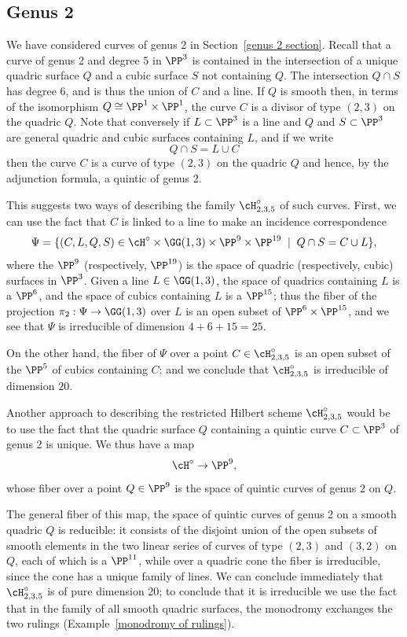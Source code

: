 \subsection{Genus 2}

We have considered curves of genus 2 in Section~\ref{genus 2 section}.  Recall that a curve of genus 2 and degree 5 in 
$\PP^3$ is contained in the intersection of a unique quadric surface $Q$ and a cubic surface $S$ not containing $Q$.
The intersection $Q\cap S$
has degree 6, and is thus the union of $C$ and a line. If $Q$ is smooth then, in terms of the isomorphism $Q \cong \PP^1 \times \PP^1$, the curve $C$ is a divisor of type $(2,3)$ on the quadric $Q$. Note that conversely if $L \subset \PP^3$ is a line and $Q$ and $S \subset \PP^3$ are general quadric and cubic surfaces containing $L$, and if we write
$$
Q \cap S = L \cup C
$$ 
then the curve $C$ is a curve of type $(2,3)$ on the quadric $Q$ and hence, by the adjunction formula,
 a quintic of genus 2.

This suggests two ways of describing the family $\cH^\circ_{2,3,5}$ of such curves. First, we can use the fact that $C$ is linked to a line to make an incidence correspondence
$$
\Psi = \{ (C, L, Q, S) \in \cH^\circ \times \GG(1,3) \times \PP^9 \times \PP^{19} \; \mid \; Q \cap S = C \cup L \},
$$
where the $\PP^9$ (respectively, $\PP^{19}$) is the space of quadric (respectively, cubic) surfaces in $\PP^3$. Given a line $L \in \GG(1,3)$, the space of quadrics containing $L$ is a $\PP^6$, and the space of cubics containing $L$ is a $\PP^{15}$; thus the fiber of the projection $\pi_2 : \Psi \to \GG(1,3)$ over $L$ is an open subset of $\PP^6 \times \PP^{15}$, and we see that $\Psi$ is irreducible of dimension $4 + 6 + 15 = 25$.

On the other hand, the fiber of $\Psi$ over a point $C \in \cH^\circ_{2,3,5}$ is an open subset of the $\PP^5$ of cubics containing $C$; and we conclude that $\cH^\circ_{2,3,5}$ is irreducible of dimension $20$.

Another approach to describing the restricted Hilbert scheme $\cH^\circ_{2,3,5}$ would be to use the fact that the quadric surface $Q$ containing a quintic curve $C \subset \PP^3$ of genus 2 is unique. We thus have a map
$$
\cH^\circ \to \PP^9,
$$
whose fiber over a point $Q \in \PP^9$ is the space of quintic curves of genus 2 on $Q$. 

The general fiber of this map, the space of quintic curves of genus 2 on a smooth quadric $Q$ is  reducible: it consists of the disjoint union of the open subsets of smooth elements in the two linear series of curves of type $(2,3)$ and $(3,2)$ on $Q$, each of which is a $\PP^{11}$, while over a 
quadric cone the fiber is irreducible, since the cone has a unique family of lines.  We can conclude immediately that $\cH^\circ_{2,3,5}$ is of pure dimension 20; to conclude that it is irreducible we use the fact that in the family of all smooth quadric surfaces, the monodromy exchanges the two rulings (Example~\ref{monodromy of rulings}).

